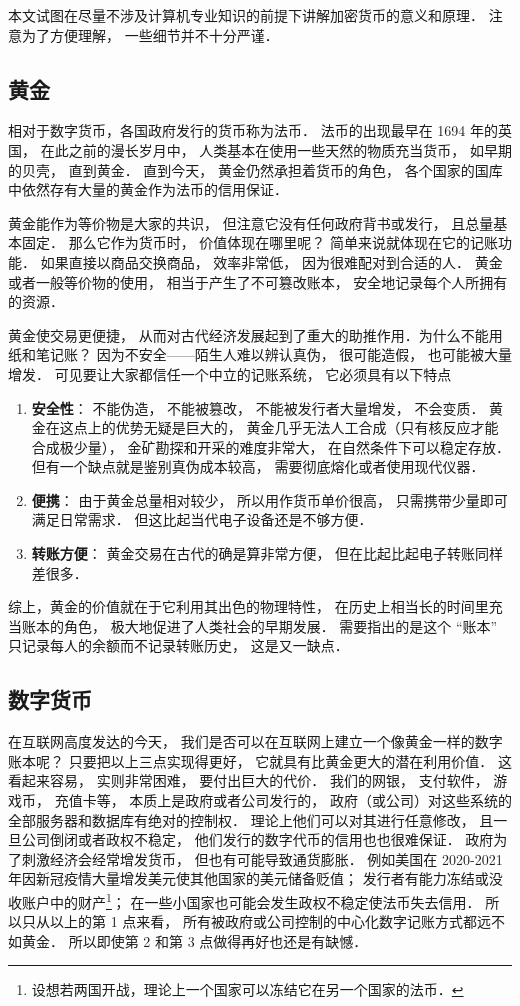 
本文试图在尽量不涉及计算机专业知识的前提下讲解加密货币的意义和原理． 注意为了方便理解， 一些细节并不十分严谨．

\subsection{黄金}
相对于数字货币，各国政府发行的货币称为法币． 法币的出现最早在 1694 年的英国， 在此之前的漫长岁月中， 人类基本在使用一些天然的物质充当货币， 如早期的贝壳， 直到黄金． 直到今天， 黄金仍然承担着货币的角色， 各个国家的国库中依然存有大量的黄金作为法币的信用保证．

黄金能作为等价物是大家的共识， 但注意它没有任何政府背书或发行， 且总量基本固定． 那么它作为货币时， 价值体现在哪里呢？ 简单来说就体现在它的记账功能． 如果直接以商品交换商品， 效率非常低， 因为很难配对到合适的人． 黄金或者一般等价物的使用， 相当于产生了不可篡改账本， 安全地记录每个人所拥有的资源．

黄金使交易更便捷， 从而对古代经济发展起到了重大的助推作用．为什么不能用纸和笔记账？ 因为不安全——陌生人难以辨认真伪， 很可能造假， 也可能被大量增发． 可见要让大家都信任一个中立的记账系统， 它必须具有以下特点
\begin{enumerate}
\item \textbf{安全性}： 不能伪造， 不能被篡改， 不能被发行者大量增发， 不会变质． 黄金在这点上的优势无疑是巨大的， 黄金几乎无法人工合成（只有核反应才能合成极少量）， 金矿勘探和开采的难度非常大， 在自然条件下可以稳定存放． 但有一个缺点就是鉴别真伪成本较高， 需要彻底熔化或者使用现代仪器．
\item \textbf{便携}： 由于黄金总量相对较少， 所以用作货币单价很高， 只需携带少量即可满足日常需求． 但这比起当代电子设备还是不够方便．
\item \textbf{转账方便}： 黄金交易在古代的确是算非常方便， 但在比起比起电子转账同样差很多．
\end{enumerate}

综上，黄金的价值就在于它利用其出色的物理特性， 在历史上相当长的时间里充当账本的角色， 极大地促进了人类社会的早期发展． 需要指出的是这个 “账本” 只记录每人的余额而不记录转账历史， 这是又一缺点．

\subsection{数字货币}
在互联网高度发达的今天， 我们是否可以在互联网上建立一个像黄金一样的数字账本呢？ 只要把以上三点实现得更好， 它就具有比黄金更大的潜在利用价值． 这看起来容易， 实则非常困难， 要付出巨大的代价． 我们的网银， 支付软件， 游戏币， 充值卡等， 本质上是政府或者公司发行的， 政府（或公司）对这些系统的全部服务器和数据库有绝对的控制权． 理论上他们可以对其进行任意修改， 且一旦公司倒闭或者政权不稳定， 他们发行的数字代币的信用也也很难保证． 政府为了刺激经济会经常增发货币， 但也有可能导致通货膨胀． 例如美国在 2020-2021 年因新冠疫情大量增发美元使其他国家的美元储备贬值； 发行者有能力冻结或没收账户中的财产\footnote{设想若两国开战，理论上一个国家可以冻结它在另一个国家的法币．}； 在一些小国家也可能会发生政权不稳定使法币失去信用． 所以只从以上的第 1 点来看， 所有被政府或公司控制的中心化数字记账方式都远不如黄金． 所以即使第 2 和第 3 点做得再好也还是有缺憾．

